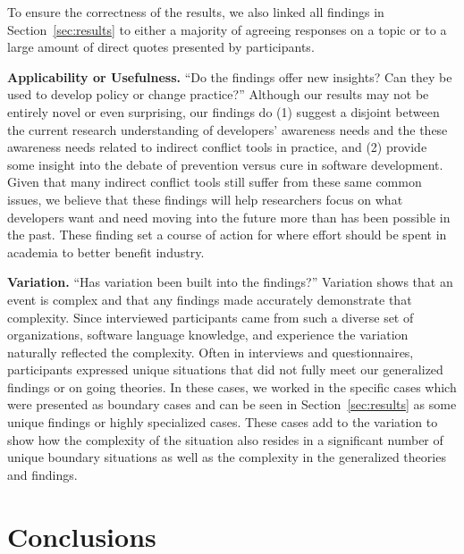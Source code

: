 \documentclass[conference]{IEEEtran}
\begin{document}
To ensure the correctness of the results, we also linked all findings in Section~\ref{sec:results} to either a majority of agreeing
responses on a topic or to a large amount of direct quotes presented by participants.

{\bfseries Applicability or Usefulness.} ``Do the findings offer new insights? Can they be used to develop policy or change practice?''
Although our results may not be entirely novel or even surprising, our findings do (1) suggest
a disjoint between the current research understanding of developers' awareness needs and the these awareness needs related to indirect conflict tools in practice, and (2) provide some
insight into the debate of prevention versus cure in software development. Given that many indirect conflict tools still suffer from these same common
issues, we believe that these findings will help researchers focus on what developers want and need moving into the future more than has
been possible in the past. These finding set a course of action for where effort should be spent in academia to better benefit industry.


{\bfseries Variation.} ``Has variation been built into the findings?'' Variation shows that an event is complex and that any findings
made accurately demonstrate that complexity. Since interviewed participants came from such a diverse set of organizations,
software language knowledge, and experience the variation naturally reflected the complexity. Often in interviews and questionnaires, participants
expressed unique situations that did not fully meet our generalized findings or on going theories. In these cases, we worked in the specific
cases which were presented as boundary cases and can be seen in Section~\ref{sec:results} as some unique findings or highly
specialized cases. These cases add to the variation
to show how the complexity of the situation also resides in a significant number of unique boundary situations as well as the complexity
in the generalized theories and findings.

\section{Conclusions}
\label{sec:conc}
\end{document}
